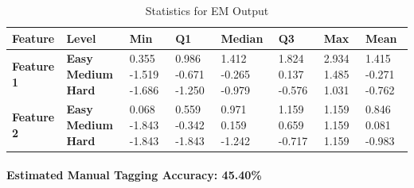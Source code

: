 \documentclass[12pt]{article}
\begin{document}
	\begin{center}
	\begin{table}[h]
		\begin{tabular}{ | m{2cm} | m{1.7cm} | m{1.3cm} | m{1.3cm} | m{1.5cm} | m{1.3cm} | m{1.3cm} | m{1.3cm} | }
		\hline
		\textbf{Feature} & \textbf{Level} & \textbf{Min} & \textbf{Q1} & \textbf{Median} & \textbf{Q3} & \textbf{Max} & \textbf{Mean}\\ 
		\hline
		\textbf{Feature 1} & \textbf{Easy Medium Hard} & 0.355 \hspace{5mm}-1.519 \hspace{5mm}-1.686 & 0.986 \hspace{5mm}-0.671 \hspace{5mm}-1.250 & 1.412  \hspace{5mm}-0.265 \hspace{5mm}-0.979 & 1.824 \hspace{5mm}0.137 \hspace{5mm}-0.576 & 2.934 \hspace{5mm}1.485 \hspace{5mm}1.031 & 1.415 \hspace{5mm}-0.271 \hspace{5mm}-0.762\\
		\hline
		\textbf{Feature 2} & \textbf{Easy Medium Hard} & 0.068 \hspace{5mm}-1.843 \hspace{5mm}-1.843 & 0.559 \hspace{5mm}-0.342 \hspace{5mm}-1.843 & 0.971  \hspace{5mm}0.159 \hspace{5mm}-1.242 & 1.159 \hspace{5mm}0.659 \hspace{5mm}-0.717 & 1.159 \hspace{5mm}1.159 \hspace{5mm}1.159 & 0.846 \hspace{5mm}0.081 \hspace{5mm}-0.983\\
		\hline
		\end{tabular}
		\caption{Statistics for EM Output}
	\end{table}
	\end{center}
	
	\paragraph{Estimated Manual Tagging Accuracy: 45.40\%}
	
\end{document}
